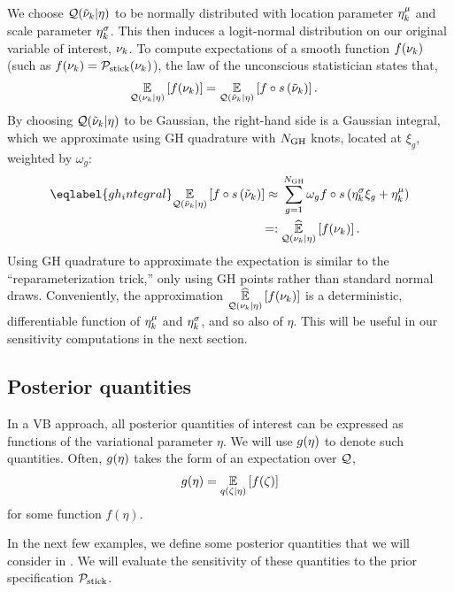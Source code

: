 We choose $\mathcal{Q}(\tilde{\nu}_k \vert \eta)$ to be normally distributed with
location parameter $\eta^{\mu}_k$ and scale parameter $\eta^{\sigma}_k$.
This then induces a logit-normal
distribution on our original variable of interest, $\nu_{k}$.
To compute expectations of a smooth function
$f(\nu_{k})$ (such as $f(\nu_{k}) = \mathcal{P}_{\mathrm{stick}}(\nu_{k})$),
the law of the unconscious statistician states that,
\begin{align*}
  \underset{\mathcal{Q}(\nu_{k} \vert \eta)}{\mathbb{E}}\left[f(\nu_{k})\right] ={}&
  \underset{\mathcal{Q}(\tilde{\nu}_k \vert \eta)}{\mathbb{E}}\left[f\circ s\left(\tilde{\nu}_k\right)\right].
\end{align*}
By choosing $\mathcal{Q}(\tilde{\nu}_k \vert \eta)$ to be Gaussian,
the right-hand side is a Gaussian integral,
which we approximate
using GH quadrature with $N_{\mathrm{GH}}$ knots,
located at $\xi_g$, weighted by $\omega_g$:
%
\begin{align}\eqlabel{gh_integral}
%
\expect{\q(\lnu_\k \vert \eta)}
       {f\circ \s\left(\lnu_\k\right)}
\approx{}&
    \sum_{g=1}^{\ngh} \omega_g f\circ \s \left(\lnusd_\k \xi_{g} + \lnumean_\k\right)
 \nonumber\\=:{}&
\expecthat{\q(\nuk \vert \eta)}{f(\nuk)}.
%
\end{align}
%
Using GH quadrature to approximate the expectation
is similar to the ``reparameterization trick,'' only using
GH points rather than standard normal draws.
Conveniently, the approximation $\underset{\mathcal{Q}(\nu_{k} \vert \eta)}{\widehat{\mathbb{E}}}\left[f(\nu_{k})\right]$
is a deterministic, differentiable
function of $\eta^{\mu}_k$ and $\eta^{\sigma}_k$, and so also of $\eta$.
This will be useful in our sensitivity computations in the next section.

\hrulefill

\subsection{Posterior quantities}

In a VB approach, all posterior quantities of interest can be expressed as
functions of the variational parameter $\eta$. We will use $g(\eta)$ to denote
such quantities. Often, $g(\eta)$ takes the form of an expectation over $\mathcal{Q}$,
\begin{align*}
  g(\eta) = \underset{q(\zeta\vert\eta)}{\mathbb{E}}\left[f(\zeta)\right]
\end{align*}
for some function $f(\eta)$.

In the next few examples, we define some posterior quantities that we will
consider in . We will evaluate the sensitivity
of these quantities to the prior specification $\mathcal{P}_{\mathrm{stick}}$.

